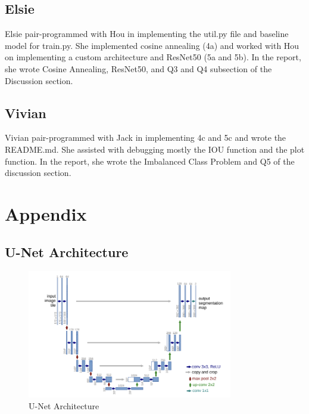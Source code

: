 \documentclass{article}
\begin{document}
\subsection{Elsie}
Elsie pair-programmed with Hou in implementing the util.py file and baseline model for train.py. She implemented cosine annealing (4a) and worked with Hou on implementing a custom architecture and ResNet50 (5a and 5b). In the report, she wrote Cosine Annealing, ResNet50, and Q3 and Q4 subsection of the Discussion section.

\subsection{Vivian}
Vivian pair-programmed with Jack in implementing 4c and 5c and wrote the README.md. She assisted with debugging mostly the IOU function and the plot function. In the report, she wrote the Imbalanced Class Problem and Q5 of the discussion section.






\appendix
\section{Appendix}
\label{sec:appendix}

\subsection{U-Net Architecture}
\label{sec:unet_architecture}
\begin{figure}
  \centering
  \includegraphics[width=0.8\textwidth]{include/u-net.png}
  \caption{U-Net Architecture}
  \label{fig:unet_architecture}
\end{figure}
\end{document}
